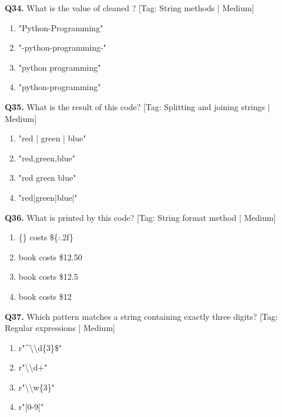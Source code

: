 \vspace{2mm}
\noindent\textbf{Q34.} What is the value of cleaned ? \hfill [Tag: String methods | Medium]
\begin{enumerate}[label=(\alph*),topsep=2pt,itemsep=1pt,partopsep=0pt,parsep=0pt]
    \item {"Python-Programming"}
    \item {"-python-programming-"}
    \item {"python programming"}
    \item {"python-programming"}
\end{enumerate}
\vspace{2mm}
\noindent\textbf{Q35.} What is the result of this code? \hfill [Tag: Splitting and joining strings | Medium]
\begin{enumerate}[label=(\alph*),topsep=2pt,itemsep=1pt,partopsep=0pt,parsep=0pt]
    \item {"red | green | blue"}
    \item {"red,green,blue"}
    \item {"red green blue"}
    \item {"red|green|blue|"}
\end{enumerate}
\vspace{2mm}
\noindent\textbf{Q36.} What is printed by this code? \hfill [Tag: String format method | Medium]
\begin{enumerate}[label=(\alph*),topsep=2pt,itemsep=1pt,partopsep=0pt,parsep=0pt]
    \item {\{\} costs \$\{:.2f\}}
    \item {book costs \$12.50}
    \item {book costs \$12.5}
    \item {book costs \$12}
\end{enumerate}
\vspace{2mm}
\noindent\textbf{Q37.} Which pattern matches a string containing exactly three digits? \hfill [Tag: Regular expressions | Medium]
\begin{enumerate}[label=(\alph*),topsep=2pt,itemsep=1pt,partopsep=0pt,parsep=0pt]
    \item {r"\textasciicircum{}\textbackslash{}\textbackslash{}d\{3\}\$"}
    \item {r"\textbackslash{}\textbackslash{}d+"}
    \item {r"\textbackslash{}\textbackslash{}w\{3\}"}
    \item {r"[0-9]"}
\end{enumerate}
\vspace{2mm}
